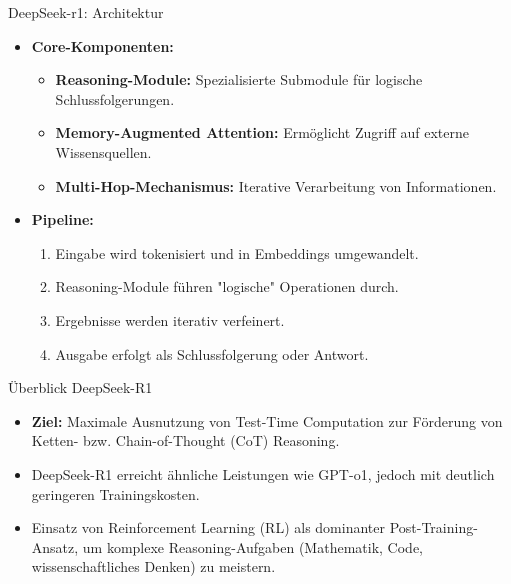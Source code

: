 \documentclass[aspectratio=1610, xcolor=dvipsnames, 9pt]{beamer}
\begin{document}
\begin{frame}{DeepSeek-r1: Architektur}
  \begin{itemize}
    \item \textbf{Core-Komponenten:}
      \begin{itemize}
        \item \textbf{Reasoning-Module:} Spezialisierte Submodule für logische Schlussfolgerungen.
        \item \textbf{Memory-Augmented Attention:} Ermöglicht Zugriff auf externe Wissensquellen.
        \item \textbf{Multi-Hop-Mechanismus:} Iterative Verarbeitung von Informationen.
      \end{itemize}
    \item \textbf{Pipeline:}
      \begin{enumerate}
        \item Eingabe wird tokenisiert und in Embeddings umgewandelt.
        \item Reasoning-Module führen "logische" Operationen durch.
        \item Ergebnisse werden iterativ verfeinert.
        \item Ausgabe erfolgt als Schlussfolgerung oder Antwort.
      \end{enumerate}
  \end{itemize}
\end{frame}

\begin{frame}{Überblick DeepSeek-R1}
  \begin{itemize}
      \item \textbf{Ziel:} Maximale Ausnutzung von Test-Time Computation zur Förderung von Ketten- bzw. Chain-of-Thought (CoT) Reasoning.
      \item DeepSeek-R1 erreicht ähnliche Leistungen wie GPT-o1, jedoch mit deutlich geringeren Trainingskosten.
      \item Einsatz von Reinforcement Learning (RL) als dominanter Post-Training-Ansatz, um komplexe Reasoning-Aufgaben (Mathematik, Code, wissenschaftliches Denken) zu meistern.
  \end{itemize}
\end{frame}
\end{document}
